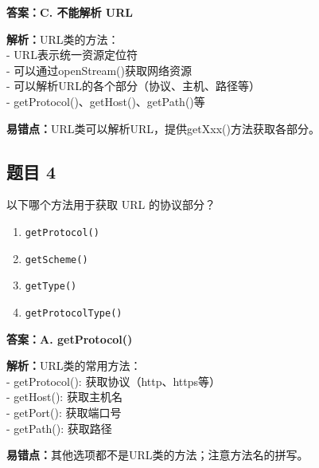 \documentclass[12pt,a4paper]{ctexart}
\begin{document}
\begin{answerbox}
	\textbf{答案：C. 不能解析 URL}

	\textbf{解析：}URL类的方法：\\
	- URL表示统一资源定位符\\
	- 可以通过openStream()获取网络资源\\
	- 可以解析URL的各个部分（协议、主机、路径等）\\
	- getProtocol()、getHost()、getPath()等

	\textbf{易错点：}URL类可以解析URL，提供getXxx()方法获取各部分。
\end{answerbox}

\subsection*{题目 4}
以下哪个方法用于获取 URL 的协议部分？
\begin{enumerate}[label=\Alph*.]
	\item \texttt{getProtocol()}
	\item \texttt{getScheme()}
	\item \texttt{getType()}
	\item \texttt{getProtocolType()}
\end{enumerate}

\begin{answerbox}
	\textbf{答案：A. getProtocol()}

	\textbf{解析：}URL类的常用方法：\\
	- getProtocol(): 获取协议（http、https等）\\
	- getHost(): 获取主机名\\
	- getPort(): 获取端口号\\
	- getPath(): 获取路径

	\textbf{易错点：}其他选项都不是URL类的方法；注意方法名的拼写。
\end{answerbox}
\end{document}
